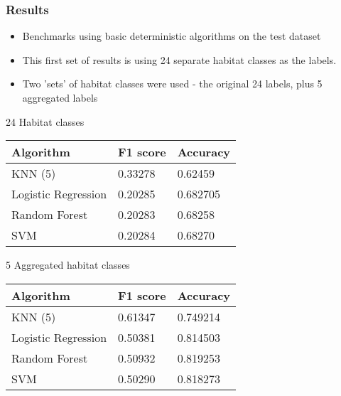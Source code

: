 \documentclass{beamer}
\begin{document}
\begin{frame}
    \frametitle{Results}

    \begin{itemize}
        \item Benchmarks using basic deterministic algorithms on the test dataset
        \item This first set of results is using 24 separate habitat classes as the labels.
        \item Two 'sets' of habitat classes were used - the original 24 labels, plus 5 aggregated labels
    \end{itemize}

    {\scriptsize
    24 Habitat classes

    \begin{tabular}{| l | l | l |}
        Algorithm           & F1 score & Accuracy \\\hline
        KNN (5)             & 0.33278 & 0.62459 \\
        Logistic Regression & 0.20285 & 0.682705 \\
        Random Forest       & 0.20283 & 0.68258 \\
        SVM                 & 0.20284 & 0.68270 \\
    \end{tabular}

    5 Aggregated habitat classes

    \begin{tabular}{| l | l | l |}
        Algorithm           & F1 score & Accuracy \\\hline
        KNN (5)             & 0.61347 & 0.749214 \\
        Logistic Regression & 0.50381 & 0.814503 \\
        Random Forest       & 0.50932 & 0.819253 \\
        SVM                 & 0.50290 & 0.818273 \\
    \end{tabular}
    }
\end{frame}
\end{document}

